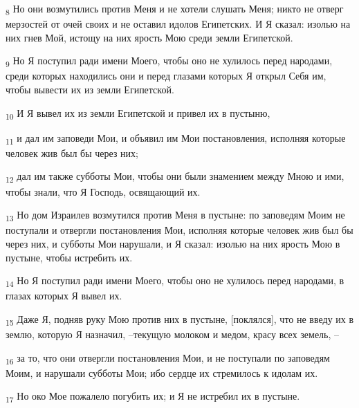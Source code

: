 \begin{tcolorbox}
\textsubscript{8} Но они возмутились против Меня и не хотели слушать Меня; никто не отверг мерзостей от очей своих и не оставил идолов Египетских. И Я сказал: изолью на них гнев Мой, истощу на них ярость Мою среди земли Египетской.
\end{tcolorbox}
\begin{tcolorbox}
\textsubscript{9} Но Я поступил ради имени Моего, чтобы оно не хулилось перед народами, среди которых находились они и перед глазами которых Я открыл Себя им, чтобы вывести их из земли Египетской.
\end{tcolorbox}
\begin{tcolorbox}
\textsubscript{10} И Я вывел их из земли Египетской и привел их в пустыню,
\end{tcolorbox}
\begin{tcolorbox}
\textsubscript{11} и дал им заповеди Мои, и объявил им Мои постановления, исполняя которые человек жив был бы через них;
\end{tcolorbox}
\begin{tcolorbox}
\textsubscript{12} дал им также субботы Мои, чтобы они были знамением между Мною и ими, чтобы знали, что Я Господь, освящающий их.
\end{tcolorbox}
\begin{tcolorbox}
\textsubscript{13} Но дом Израилев возмутился против Меня в пустыне: по заповедям Моим не поступали и отвергли постановления Мои, исполняя которые человек жив был бы через них, и субботы Мои нарушали, и Я сказал: изолью на них ярость Мою в пустыне, чтобы истребить их.
\end{tcolorbox}
\begin{tcolorbox}
\textsubscript{14} Но Я поступил ради имени Моего, чтобы оно не хулилось перед народами, в глазах которых Я вывел их.
\end{tcolorbox}
\begin{tcolorbox}
\textsubscript{15} Даже Я, подняв руку Мою против них в пустыне, [поклялся], что не введу их в землю, которую Я назначил, --текущую молоком и медом, красу всех земель, --
\end{tcolorbox}
\begin{tcolorbox}
\textsubscript{16} за то, что они отвергли постановления Мои, и не поступали по заповедям Моим, и нарушали субботы Мои; ибо сердце их стремилось к идолам их.
\end{tcolorbox}
\begin{tcolorbox}
\textsubscript{17} Но око Мое пожалело погубить их; и Я не истребил их в пустыне.
\end{tcolorbox}
